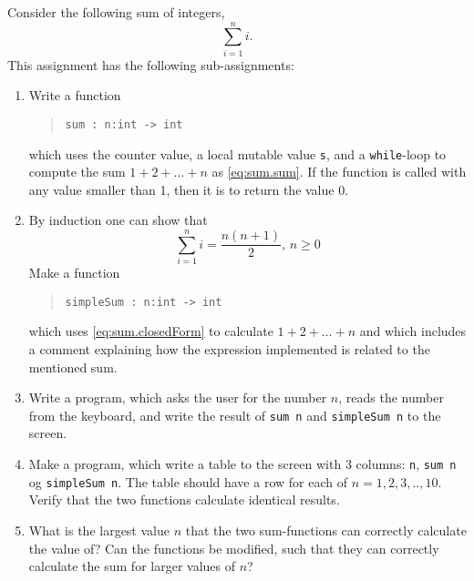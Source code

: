 Consider the following sum of integers,
\begin{equation}
  \sum_{i=1}^n i.
  \label{eq:sum.sum}
\end{equation}
This assignment has the following sub-assignments:
\begin{enumerate}
\item \label{sum} Write a function
  \begin{quote}
    \mbox{\lstinline!sum : n:int -> int!}
  \end{quote}
  which uses the counter value, a local mutable value \lstinline!s!,
  and a \lstinline!while!-loop to compute the sum $1 + 2 + \dots + n$
  as \eqref{eq:sum.sum}. If the function is called with any value smaller than 1, then it is to return the value 0.
\item By induction one can show that
  \begin{equation}
    \sum_{i=1}^n i = \frac{n(n+1)}{2},\, n\geq 0
    \label{eq:sum.closedForm}
  \end{equation}
  Make a function
  \begin{quote}
    \mbox{\lstinline!simpleSum : n:int -> int!}
  \end{quote}
  which uses \eqref{eq:sum.closedForm} to calculate $1 + 2 + \dots + n$ and which includes a comment explaining how the expression implemented is related to the mentioned sum.
\item Write a program, which asks the user for the number $n$, reads the number from the keyboard, and write the result of \lstinline{sum n} and \lstinline!simpleSum n! to the screen.
\item Make a program, which write a table to the screen with 3
  columns: \lstinline!n!, \lstinline!sum n! og
  \mbox{\lstinline!simpleSum n!}. The table should have a row for each
  of $n=1,2,3,..,10$. Verify that the two functions calculate
  identical results.
\item What is the largest value $n$ that the two sum-functions can
  correctly calculate the value of? Can the functions be modified,
  such that they can correctly calculate the sum for larger values of
  $n$?
  \end{enumerate}
